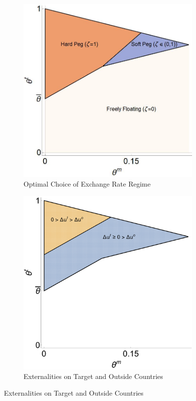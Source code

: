 \documentclass[12pt,letter]{article}
\theoremstyle{break} \theorembodyfont{\normalfont\itshape}
\theoremstyle{break}
\theoremstyle{break} \theorembodyfont{\normalfont\itshape}
\theoremstyle{break} \theorembodyfont{\normalfont\itshape}
\begin{document}
\begin{figure}
  \begin{minipage}{\linewidth}
    \begin{centering}
      \caption{Optimal Stabilizations}\label{fig_optimal}
      \begin{subfigure}{.49\textwidth}
        \caption{Optimal Choice of Exchange Rate Regime}
        \includegraphics[width=\textwidth]{./Figures/Figure_Optimal_Policy_1.jpg}
      \end{subfigure}
      \begin{subfigure}{.49\textwidth}
        \caption{Externalities on Target and Outside Countries}
        \includegraphics[width=\textwidth]{./Figures/Figure_Winners_and_Losers.pdf}

\end{subfigure}
\end{centering}
\end{minipage}
\end{figure}
\end{document}
